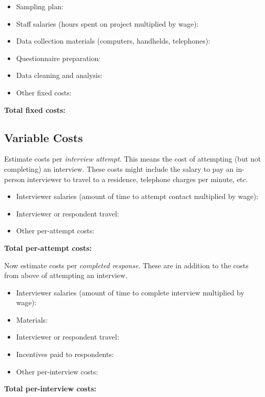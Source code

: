 \documentclass[12pt, a4]{article}
\begin{document}
\begin{itemize}
\item Sampling plan: 
\item Staff salaries (hours spent on project multiplied by wage):
\item Data collection materials (computers, handhelds, telephones):
\item Questionnaire preparation:
\item Data cleaning and analysis:
\item Other fixed costs:\\
\end{itemize}
\textbf{Total fixed costs:}

\subsection{Variable Costs}

\noindent Estimate costs per \textit{interview attempt}. This means the cost of attempting (but not completing) an interview. These costs might include the salary to pay an in-person interviewer to travel to a residence, telephone charges per minute, etc.

\begin{itemize}
\item Interviewer salaries (amount of time to attempt contact multiplied by wage):
\item Interviewer or respondent travel:
\item Other per-attempt costs: \\
\end{itemize}
\textbf{Total per-attempt costs:}

\vspace{2em}

\noindent Now estimate costs per \textit{completed response}. These are in addition to the costs from above of attempting an interview.

\begin{itemize}
\item Interviewer salaries (amount of time to complete interview multiplied by wage):
\item Materials:
\item Interviewer or respondent travel:
\item Incentives paid to respondents:
\item Other per-interview costs:\\
\end{itemize}
\textbf{Total per-interview costs:}
\end{document}
